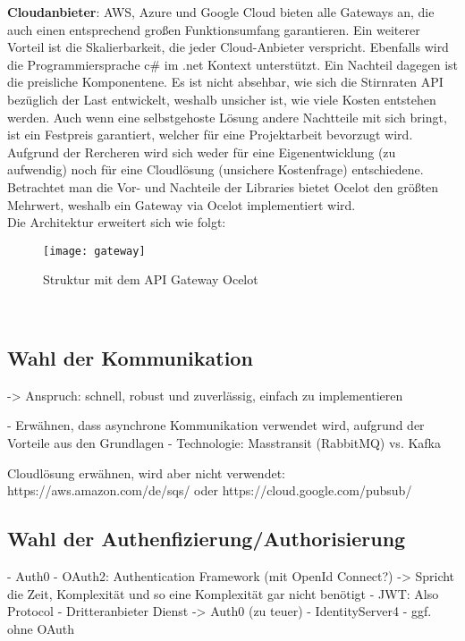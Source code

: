 {\textbf{Cloudanbieter}: AWS, Azure und Google Cloud bieten alle Gateways an, die auch einen entsprechend großen Funktionsumfang garantieren. Ein weiterer Vorteil ist die Skalierbarkeit, die jeder Cloud-Anbieter verspricht. Ebenfalls wird die Programmiersprache c\# im .net Kontext unterstützt.\cite{GoogleCloudEndpointsDotNet}\cite{AWSDotNet} Ein Nachteil dagegen ist die preisliche Komponentene. Es ist nicht absehbar, wie sich die Stirnraten API bezüglich der Last entwickelt, weshalb unsicher ist, wie viele Kosten entstehen werden. Auch wenn eine selbstgehoste Lösung andere Nachtteile mit sich bringt, ist ein Festpreis garantiert, welcher für eine Projektarbeit bevorzugt wird. \\

Aufgrund der Rercheren wird sich weder für eine Eigenentwicklung (zu aufwendig) noch für eine Cloudlösung (unsichere Kostenfrage) entschiedene. Betrachtet man die Vor- und Nachteile der Libraries bietet Ocelot den größten Mehrwert, weshalb ein Gateway via Ocelot implementiert wird.\\

Die Architektur erweitert sich wie folgt: 
\begin{figure}[ht]
	\centering
	\texttt{[image: gateway]}
	\caption[API Gateway mit Ocelot] {Struktur mit dem API Gateway Ocelot}
	\label{fig:gateway}
\end{figure}
\\

\subsection{Wahl der Kommunikation}
-> Anspruch: schnell, robust und zuverlässig, einfach zu implementieren

- Erwähnen, dass asynchrone Kommunikation verwendet wird, aufgrund der Vorteile aus den Grundlagen 
- Technologie: Masstransit (RabbitMQ) vs. Kafka


Cloudlösung erwähnen, wird aber nicht verwendet: https://aws.amazon.com/de/sqs/ oder https://cloud.google.com/pubsub/


\subsection{Wahl der Authenfizierung/Authorisierung}
- Auth0
- OAuth2: Authentication Framework (mit OpenId Connect?) -> Spricht die Zeit, Komplexität und so eine Komplexität gar nicht benötigt 
- JWT: Also Protocol
- Dritteranbieter Dienst -> Auth0 (zu teuer)
- IdentityServer4
- ggf. ohne OAuth

}
